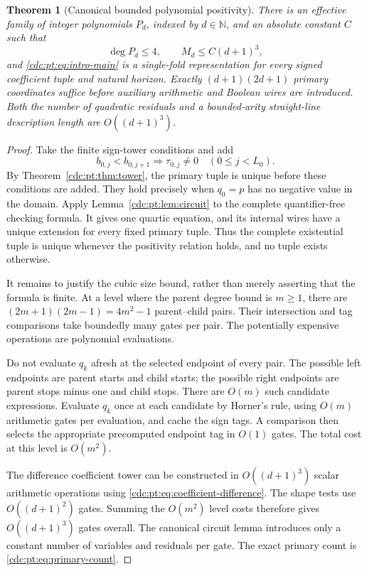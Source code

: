 \documentclass[11pt,a4paper]{article}
\newtheorem{theorem}{Theorem}[section]
\theoremstyle{definition}
\theoremstyle{remark}
\newcommand{\N}{\mathbb N}
\begin{document}
\begin{theorem}[Canonical bounded polynomial positivity]
\label{cdc:pt:thm:main}
There is an effective family of integer polynomials $P_d$, indexed by
$d\in\N$, and an absolute constant $C$ such that
\[
 \deg P_d\leq4,\qquad M_d\leq C(d+1)^3,
\]
and \eqref{cdc:pt:eq:intro-main} is a single-fold representation for every signed
coefficient tuple and natural horizon. Exactly $(d+1)(2d+1)$ primary
coordinates suffice before auxiliary arithmetic and Boolean wires are
introduced. Both the number of quadratic residuals and a bounded-arity
straight-line description length are $O((d+1)^3)$.
\end{theorem}
\begin{proof}
Take the finite sign-tower conditions and add
\begin{equation}
 b_{0,j}<b_{0,j+1}\Longrightarrow \tau_{0,j}\neq0
 \quad(0\leq j<L_0).
 \label{cdc:pt:eq:nonnegative-tags}
\end{equation}
By Theorem~\ref{cdc:pt:thm:tower}, the primary tuple is unique before these
conditions are added. They hold precisely when $q_0=p$ has no negative
value in the domain. Apply Lemma~\ref{cdc:pt:lem:circuit} to the complete
quantifier-free checking formula. It gives one quartic equation, and its
internal wires have a unique extension for every fixed primary tuple.
Thus the complete existential tuple is unique whenever the positivity
relation holds, and no tuple exists otherwise.

It remains to justify the cubic size bound, rather than merely asserting
that the formula is finite. At a level where the parent degree bound is
$m\geq1$, there are $(2m+1)(2m-1)=4m^2-1$ parent--child pairs.
Their intersection and tag comparisons take boundedly many gates per
pair. The potentially expensive operations are polynomial evaluations.

Do not evaluate $q_k$ afresh at the selected endpoint of every pair.
The possible left endpoints are parent starts and child starts; the
possible right endpoints are parent stops minus one and child stops.
There are $O(m)$ such candidate expressions. Evaluate $q_k$ once at each
candidate by Horner's rule, using $O(m)$ arithmetic gates per evaluation,
and cache the sign tags. A comparison then selects the appropriate
precomputed endpoint tag in $O(1)$ gates. The total cost at this level is
$O(m^2)$.

The difference coefficient tower can be constructed in $O((d+1)^3)$
scalar arithmetic operations using \eqref{cdc:pt:eq:coefficient-difference}.
The shape tests use $O((d+1)^2)$ gates. Summing the $O(m^2)$ level costs
therefore gives $O((d+1)^3)$ gates overall. The canonical circuit lemma
introduces only a constant number of variables and residuals per gate.
The exact primary count is \eqref{cdc:pt:eq:primary-count}.
\end{proof}
\end{document}
